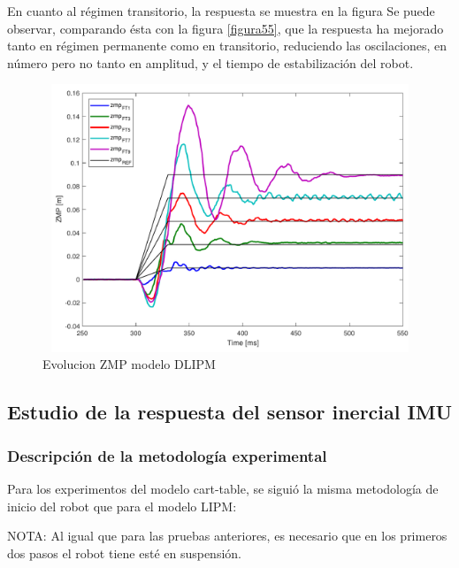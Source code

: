 En cuanto al régimen transitorio, la respuesta se muestra en la figura %
Se puede observar, comparando ésta con la figura \ref{figura55}, que la respuesta ha mejorado tanto en régimen permanente como en transitorio, reduciendo las oscilaciones, en número pero no tanto en amplitud, y el tiempo de estabilización del robot.



\begin{figure}[H]
\centering
\includegraphics[width=13cm, height=8cm]{imagenes/apartado_5/512_evolucion_zmp_dlipm.pdf}
\caption{Evolucion ZMP modelo DLIPM}
\label{figura513}
\end{figure}

\subsection{Estudio de la respuesta del sensor inercial IMU}\label{respuestaIMU}

\subsubsection{Descripción de la metodología experimental}

Para los experimentos del modelo cart-table, se siguió la misma metodología de inicio del robot que para el modelo LIPM:

NOTA: Al igual que para las pruebas anteriores, es necesario que en los primeros dos pasos el robot tiene esté en suspensión.


